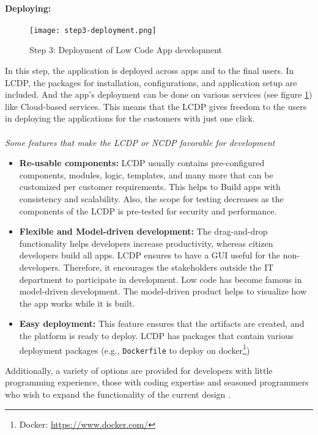 \paragraph*{Deploying:}
\begin{figure}[htbp!]
  \centering    
  \texttt{[image: step3-deployment.png]}
  \caption[Testing]{Step 3: Deployment of Low Code App development}
  \label{fig:background:deploying}
\end{figure}
In this step, the application is deployed across apps and to the final users.
In LCDP, the packages for installation, configurations, and application setup are included.
And the app's deployment can be done on various services (see figure \ref{fig:background:deploying}) like Cloud-based services.
This means that the LCDP gives freedom to the users in deploying the applications for the customers with just one click.  \\\\
\textit{Some features that make the LCDP or NCDP favorable for development} \cite{article:nocode:sahina, article:nocode:ihirwe, paper:lowcode:cabot}
\begin{itemize}
  \item \textbf{Re-usable components:} LCDP usually contains pre-configured components, modules, logic, templates, and many more that can be customized per customer requirements. This helps to Build apps with consistency and scalability. Also, the scope for testing decreases as the components of the LCDP is pre-tested for security and performance. 
  \item \textbf{Flexible and Model-driven development:} The drag-and-drop functionality helps developers increase productivity, whereas citizen developers build all apps. LCDP ensures to have a GUI useful for the non-developers. Therefore, it encourages the stakeholders outside the IT department to participate in development. Low code has become famous in model-driven development. The model-driven product helps to visualize how the app works while it is built.
  \item \textbf{Easy deployment:} This feature ensures that the artifacts are created, and the platform is ready to deploy. LCDP has packages that contain various deployment packages (e.g., \texttt{Dockerfile} to deploy on docker\footnote{Docker: \url{https://www.docker.com/}})
\end{itemize}

Additionally, a variety of options are provided for developers with little programming experience, those with coding expertise and seasoned programmers who wish to expand the functionality of the current design \cite{article:nocode:sahina}.
\clearpage
